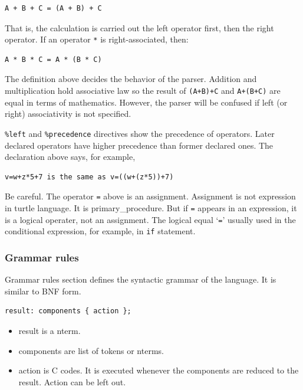 \begin{lstlisting}
A + B + C = (A + B) + C
\end{lstlisting}

That is, the calculation is carried out the left operator first, then
the right operator. If an operator \passthrough{\lstinline!*!} is
right-associated, then:

\begin{lstlisting}
A * B * C = A * (B * C)
\end{lstlisting}

The definition above decides the behavior of the parser. Addition and
multiplication hold associative law so the result of
\passthrough{\lstinline!(A+B)+C!} and \passthrough{\lstinline!A+(B+C)!}
are equal in terms of mathematics. However, the parser will be confused
if left (or right) associativity is not specified.

\passthrough{\lstinline!\%left!} and
\passthrough{\lstinline!\%precedence!} directives show the precedence of
operators. Later declared operators have higher precedence than former
declared ones. The declaration above says, for example,

\begin{lstlisting}
v=w+z*5+7 is the same as v=((w+(z*5))+7)
\end{lstlisting}

Be careful. The operator \passthrough{\lstinline!=!} above is an
assignment. Assignment is not expression in turtle language. It is
primary\_procedure. But if \passthrough{\lstinline!=!} appears in an
expression, it is a logical operater, not an assignment. The logical
equal `\passthrough{\lstinline!=!}' usually used in the conditional
expression, for example, in \passthrough{\lstinline!if!} statement.

\hypertarget{grammar-rules}{%
\subsubsection{Grammar rules}\label{grammar-rules}}

Grammar rules section defines the syntactic grammar of the language. It
is similar to BNF form.

\begin{lstlisting}
result: components { action };
\end{lstlisting}

\begin{itemize}
\tightlist
\item
  result is a nterm.
\item
  components are list of tokens or nterms.
\item
  action is C codes. It is executed whenever the components are reduced
  to the result. Action can be left out.
\end{itemize}

